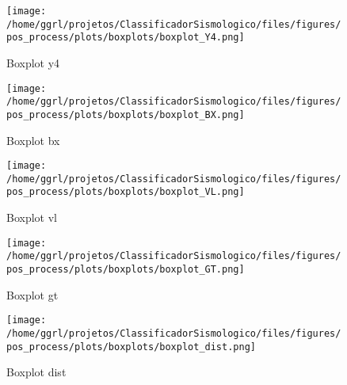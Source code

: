\begin{figure}[H]
    \centering
    \texttt{[image: /home/ggrl/projetos/ClassificadorSismologico/files/figures/pos\_process/plots/boxplots/boxplot\_Y4.png]}
    \caption{Boxplot y4}
    \label{fig:boxplot_Y4}
\end{figure}


\begin{figure}[H]
    \centering
    \texttt{[image: /home/ggrl/projetos/ClassificadorSismologico/files/figures/pos\_process/plots/boxplots/boxplot\_BX.png]}
    \caption{Boxplot bx}
    \label{fig:boxplot_BX}
\end{figure}


\begin{figure}[H]
    \centering
    \texttt{[image: /home/ggrl/projetos/ClassificadorSismologico/files/figures/pos\_process/plots/boxplots/boxplot\_VL.png]}
    \caption{Boxplot vl}
    \label{fig:boxplot_VL}
\end{figure}


\begin{figure}[H]
    \centering
    \texttt{[image: /home/ggrl/projetos/ClassificadorSismologico/files/figures/pos\_process/plots/boxplots/boxplot\_GT.png]}
    \caption{Boxplot gt}
    \label{fig:boxplot_GT}
\end{figure}


\begin{figure}[H]
    \centering
    \texttt{[image: /home/ggrl/projetos/ClassificadorSismologico/files/figures/pos\_process/plots/boxplots/boxplot\_dist.png]}
    \caption{Boxplot dist}
    \label{fig:boxplot_dist}
\end{figure}
